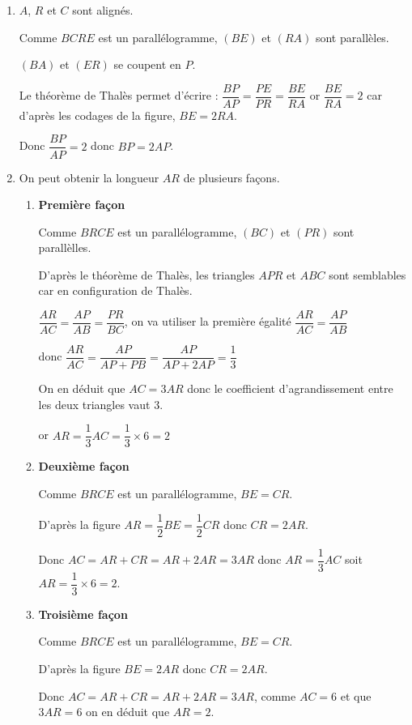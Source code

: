 \begin{corrige}
    \begin{enumerate}
        \item $A$, $R$ et $C$ sont alignés.
        
        Comme $BCRE$ est un parallélogramme, $(BE)$ et $(RA)$ sont parallèles.

        $(BA)$ et $(ER)$ se coupent en $P$.

        \medskip
        Le théorème de Thalès permet d'écrire : $\dfrac{BP}{AP}=\dfrac{PE}{PR}=\dfrac{BE}{RA}$ or $\dfrac{BE}{RA}=2$
        car d'après les codages de la figure, $BE=2RA$.

        \medskip
        Donc $\dfrac{BP}{AP}=2$ donc $BP = 2AP$.
        \item  On peut obtenir la longueur $AR$ de plusieurs façons.
        
        \begin{enumerate}
            \item \textbf{Première façon}
            
            Comme $BRCE$ est un parallélogramme, $(BC)$ et $(PR)$ sont parallèlles.

            D'après le théorème de Thalès, les triangles $APR$ et $ABC$ sont semblables car en configuration de Thalès.

            \medskip
            $\dfrac{AR}{AC}=\dfrac{AP}{AB}=\dfrac{PR}{BC}$, on va utiliser la première égalité $\dfrac{AR}{AC}=\dfrac{AP}{AB}$

            \medskip
            donc $\dfrac{AR}{AC}=\dfrac{AP}{AP+PB}=\dfrac{AP}{AP+2AP}=\dfrac{1}{3}$

            \medskip
            On en déduit que $AC=3AR$ donc le coefficient d'agrandissement entre les deux triangles vaut $3$.

            \medskip
            or $AR= \dfrac{1}{3}AC=\dfrac{1}{3}\times 6 = 2$

            \medskip
            \item \textbf{Deuxième façon}
            
            Comme $BRCE$ est un parallélogramme, $BE=CR$.

            \medskip
            D'après la figure $AR=\dfrac{1}{2}BE=\dfrac{1}{2}CR$ donc $CR=2AR$.

            \medskip
            Donc $AC=AR+CR=AR+2AR=3AR$ donc $AR=\dfrac{1}{3}AC$ soit $AR=\dfrac{1}{3}\times 6=2$.
            \item \textbf{Troisième façon}
            
            Comme $BRCE$ est un parallélogramme, $BE=CR$.

            \medskip
            D'après la figure $BE=2AR$ donc $CR=2AR$.

            \medskip
            Donc $AC=AR+CR=AR+2AR=3AR$, comme $AC=6$ et que $3AR=6$ on en déduit que $AR=2$.
        \end{enumerate}
    \end{enumerate}
\end{corrige}

